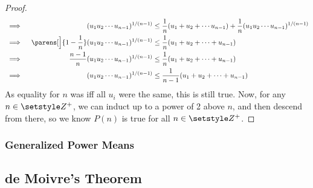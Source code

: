 \begin{proof}
\begin{alignat*}
  &\implies{}& (u_1 u_2 \dotsm u_{n - 1})^{1 / (n - 1)} &\le
          \frac 1n (u_1 + u_2 + \dotsb u_{n - 1}) +
          \frac 1n (u_1 u_2 \dotsm u_{n - 1})^{1 / (n - 1)} \\
  &\implies{}& \parens[\Big]{1 - \frac 1n}
      (u_1 u_2 \dotsm u_{n - 1})^{1 / (n - 1)} &\le
      \frac 1n (u_1 + u_2 + \dotsb + u_{n - 1}) \\
  &\implies{}& \frac {n - 1}n
          (u_1 u_2 \dotsb u_{n - 1})^{1 / (n - 1)} &\le
          \frac 1n (u_1 + u_2 + \dotsb + u_{n - 1}) \\
  &\implies{}& (u_1 u_2 \dotsm u_{n - 1})^{1 / (n - 1)} &\le
          \frac 1{n - 1} (u_1 + u_2 + \dotsb + u_{n - 1})
 \end{alignat*}
 As equality for \(n\) was iff all \(u_i\) were the same, this is still true.
 Now, for any \(n \in \Integers^+\), we can induct up to a power of 2 above
 \(n\), and then descend from there, so we know \(P(n)\) is true for all
 \(n \in \Integers^+\).
\end{proof}

\subsubsection{Generalized Power Means}

\subsection{de Moivre's Theorem}

